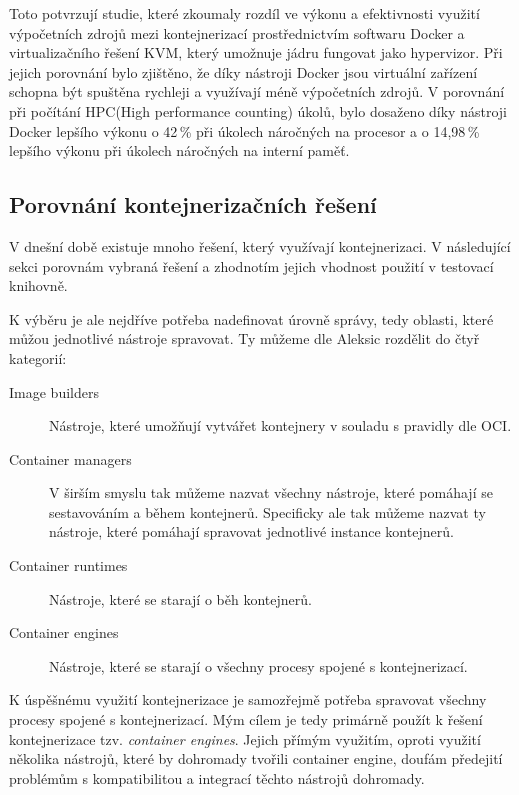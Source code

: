 Toto potvrzují studie, které zkoumaly rozdíl ve výkonu a efektivnosti využití výpočetních zdrojů mezi kontejnerizací prostřednictvím softwaru Docker a virtualizačního řešení KVM, který umožnuje jádru fungovat jako hypervizor. Při jejich porovnání bylo zjištěno, že díky nástroji Docker jsou virtuální zařízení schopna být spuštěna rychleji a využívají méně výpočetních zdrojů. V porovnání při počítání HPC(High performance counting) úkolů, bylo dosaženo díky nástroji Docker lepšího výkonu o 42\,\% při úkolech náročných na procesor a o 14,98\,\% lepšího výkonu při úkolech náročných na interní paměť.\cite{kvmdockercomp}\cite{2021virt} 


\subsection{Porovnání kontejnerizačních řešení}

V dnešní době existuje mnoho řešení, který využívají kontejnerizaci. V následující sekci porovnám vybraná řešení a zhodnotím jejich vhodnost použití v testovací knihovně. 

K výběru je ale nejdříve potřeba nadefinovat úrovně správy, tedy oblasti, které můžou jednotlivé nástroje spravovat. Ty můžeme dle Aleksic\cite{docker_alt_23} rozdělit do čtyř kategorií:

\begin{description}
    \item[Image builders] Nástroje, které umožňují vytvářet kontejnery v souladu s pravidly dle OCI.
    \item[Container managers] V širším smyslu tak můžeme nazvat všechny nástroje, které pomáhají se sestavováním a během kontejnerů. Specificky ale tak můžeme nazvat ty nástroje, které pomáhají spravovat jednotlivé instance kontejnerů.
    \item[Container runtimes] Nástroje, které se starají o běh kontejnerů.
    \item[Container engines] Nástroje, které se starají o všechny procesy spojené s  kontejnerizací.
\end{description}

K úspěšnému využití kontejnerizace je samozřejmě potřeba spravovat všechny procesy spojené s kontejnerizací. Mým cílem je tedy primárně použít k řešení kontejnerizace tzv. \textit{container engines}. Jejich přímým využitím, oproti využití několika nástrojů, které by dohromady tvořili container engine, doufám předejití problémům s kompatibilitou a integrací těchto nástrojů dohromady.

